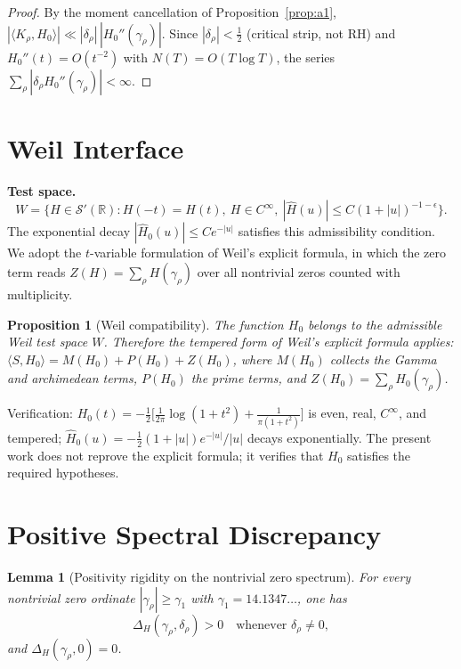 \documentclass[11pt]{article}
\newtheorem{lemma}[theorem]{Lemma}
\newtheorem{proposition}[theorem]{Proposition}
\begin{document}
\begin{proof}
By the moment cancellation of Proposition~\ref{prop:a1},
$|\langle K_\rho,H_0\rangle|\ll|\delta_\rho|\,|H_0''(\gamma_\rho)|$.
Since $|\delta_\rho|<\tfrac12$ (critical strip, not RH) and
$H_0''(t)=O(t^{-2})$ with $N(T)=O(T\log T)$, the series
$\sum_\rho|\delta_\rho H_0''(\gamma_\rho)|<\infty$.
\end{proof}

\section{Weil Interface}

\noindent\textbf{Test space.}
\begin{equation}
W=\{H\in\mathcal S'(\mathbb R): H(-t)=H(t),\ H\in C^\infty,\
|\widehat H(u)|\le C(1+|u|)^{-1-\epsilon}\}.
\end{equation}
The exponential decay $|\widehat H_0(u)|\le Ce^{-|u|}$ satisfies this
admissibility condition.  We adopt the $t$-variable formulation of Weil's
explicit formula, in which the zero term reads
$Z(H)=\sum_\rho H(\gamma_\rho)$ over all nontrivial zeros counted with
multiplicity.

\begin{proposition}[Weil compatibility]\label{prop:weil}
The function $H_0$ belongs to the admissible Weil test space $W$.
Therefore the tempered form of Weil's explicit formula applies:
$\langle S,H_0\rangle=M(H_0)+P(H_0)+Z(H_0)$, where $M(H_0)$ collects the
Gamma and archimedean terms, $P(H_0)$ the prime terms, and
$Z(H_0)=\sum_\rho H_0(\gamma_\rho)$.
\end{proposition}

\noindent Verification: $H_0(t)=-\tfrac12\bigl[\tfrac1{2\pi}\log(1+t^2)+
\tfrac1{\pi(1+t^2)}\bigr]$ is even, real, $C^\infty$, and tempered;
$\widehat H_0(u)=-\tfrac12(1+|u|)e^{-|u|}/|u|$ decays exponentially.
The present work does not reprove the explicit formula; it verifies that
$H_0$ satisfies the required hypotheses.

\section{Positive Spectral Discrepancy}

\begin{lemma}[Positivity rigidity on the nontrivial zero spectrum]\label{lem:pos}
For every nontrivial zero ordinate $|\gamma_\rho|\ge\gamma_1$ with
$\gamma_1=14.1347\ldots$, one has
\begin{equation}
\Delta_H(\gamma_\rho,\delta_\rho)>0 \quad \text{whenever }
\delta_\rho\ne0,
\end{equation}
and $\Delta_H(\gamma_\rho,0)=0$.
\end{lemma}
\end{document}
